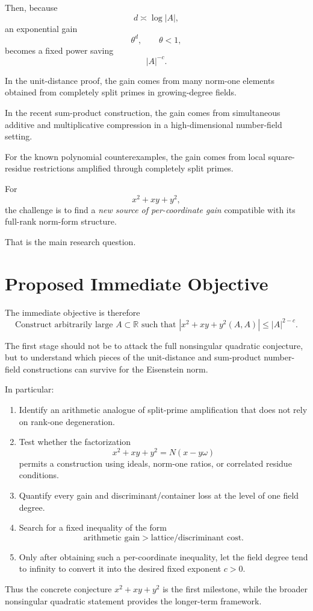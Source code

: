 \documentclass[11pt]{article}
\begin{document}
Then, because
\[
d\asymp \log |A|,
\]
an exponential gain
\[
\theta^d,
\qquad
\theta<1,
\]
becomes a fixed power saving
\[
|A|^{-c}.
\]

In the unit-distance proof, the gain comes from many norm-one elements obtained from completely split primes in growing-degree fields.

In the recent sum-product construction, the gain comes from simultaneous additive and multiplicative compression in a high-dimensional number-field setting.

For the known polynomial counterexamples, the gain comes from local square-residue restrictions amplified through completely split primes.

For
\[
x^2+xy+y^2,
\]
the challenge is to find a \emph{new source of per-coordinate gain} compatible with its full-rank norm-form structure.

That is the main research question.

\section{Proposed Immediate Objective}

The immediate objective is therefore
\[
\boxed{
\text{Construct arbitrarily large }A\subset\mathbb R
\text{ such that }
|x^2+xy+y^2(A,A)|\le |A|^{2-c}.
}
\]

The first stage should not be to attack the full nonsingular quadratic conjecture, but to understand which pieces of the unit-distance and sum-product number-field constructions can survive for the Eisenstein norm.

In particular:

\begin{enumerate}[label=\arabic*.]
    \item Identify an arithmetic analogue of split-prime amplification that does not rely on rank-one degeneration.
    \item Test whether the factorization
    \[
    x^2+xy+y^2=N(x-y\omega)
    \]
    permits a construction using ideals, norm-one ratios, or correlated residue conditions.
    \item Quantify every gain and discriminant/container loss at the level of one field degree.
    \item Search for a fixed inequality of the form
    \[
    \text{arithmetic gain}>\text{lattice/discriminant cost}.
    \]
    \item Only after obtaining such a per-coordinate inequality, let the field degree tend to infinity to convert it into the desired fixed exponent \(c>0\).
\end{enumerate}

Thus the concrete conjecture \(x^2+xy+y^2\) is the first milestone, while the broader nonsingular quadratic statement provides the longer-term framework.
\end{document}
